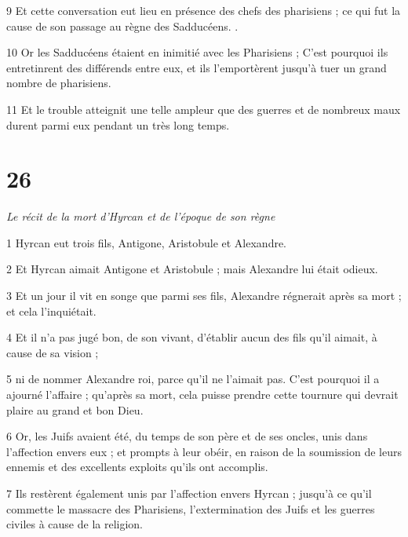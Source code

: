 \par 9 Et cette conversation eut lieu en présence des chefs des pharisiens ; ce qui fut la cause de son passage au règne des Sadducéens. .

\par 10 Or les Sadducéens étaient en inimitié avec les Pharisiens ; C'est pourquoi ils entretinrent des différends entre eux, et ils l'emportèrent jusqu'à tuer un grand nombre de pharisiens.

\par 11 Et le trouble atteignit une telle ampleur que des guerres et de nombreux maux durent parmi eux pendant un très long temps.

\chapter{26}

\par \textit{Le récit de la mort d'Hyrcan et de l'époque de son règne}

\par 1 Hyrcan eut trois fils, Antigone, Aristobule et Alexandre.

\par 2 Et Hyrcan aimait Antigone et Aristobule ; mais Alexandre lui était odieux.

\par 3 Et un jour il vit en songe que parmi ses fils, Alexandre régnerait après sa mort ; et cela l'inquiétait.

\par 4 Et il n'a pas jugé bon, de son vivant, d'établir aucun des fils qu'il aimait, à cause de sa vision ;

\par 5 ni de nommer Alexandre roi, parce qu'il ne l'aimait pas. C'est pourquoi il a ajourné l'affaire ; qu'après sa mort, cela puisse prendre cette tournure qui devrait plaire au grand et bon Dieu.

\par 6 Or, les Juifs avaient été, du temps de son père et de ses oncles, unis dans l'affection envers eux ; et prompts à leur obéir, en raison de la soumission de leurs ennemis et des excellents exploits qu'ils ont accomplis.

\par 7 Ils restèrent également unis par l'affection envers Hyrcan ; jusqu'à ce qu'il commette le massacre des Pharisiens, l'extermination des Juifs et les guerres civiles à cause de la religion.

